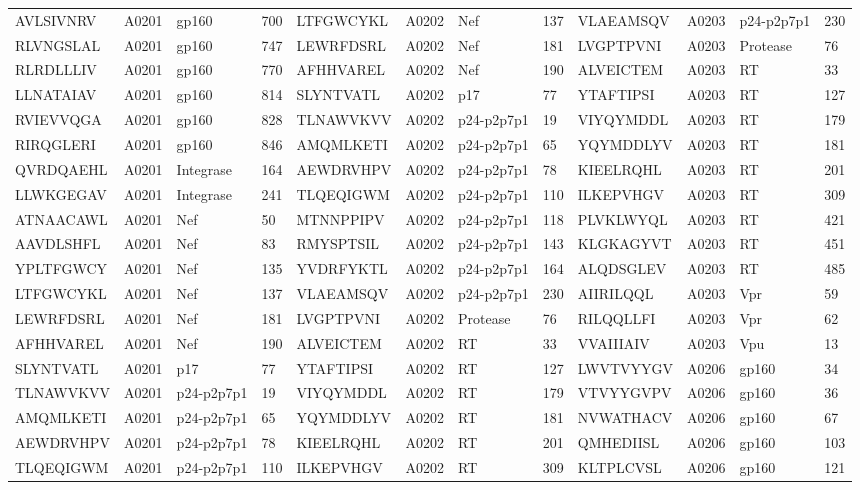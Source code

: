 \begin{table}[htp]
\begin{center}
\begin{sideways}
{\begin{tabulary}{1.5\textwidth}{|l|l|l|l|l|l|l|l|l|l|l|l|}
AVLSIVNRV & A0201 & gp160 & 700 & LTFGWCYKL & A0202 & Nef & 137 & VLAEAMSQV & A0203 & p24-p2p7p1 & 230 \\
RLVNGSLAL & A0201 & gp160 & 747 & LEWRFDSRL & A0202 & Nef & 181 & LVGPTPVNI & A0203 & Protease & 76 \\
RLRDLLLIV & A0201 & gp160 & 770 & AFHHVAREL & A0202 & Nef & 190 & ALVEICTEM & A0203 & RT & 33 \\
LLNATAIAV & A0201 & gp160 & 814 & SLYNTVATL & A0202 & p17 & 77 & YTAFTIPSI & A0203 & RT & 127 \\
RVIEVVQGA & A0201 & gp160 & 828 & TLNAWVKVV & A0202 & p24-p2p7p1 & 19 & VIYQYMDDL & A0203 & RT & 179 \\
RIRQGLERI & A0201 & gp160 & 846 & AMQMLKETI & A0202 & p24-p2p7p1 & 65 & YQYMDDLYV & A0203 & RT & 181 \\
QVRDQAEHL & A0201 & Integrase & 164 & AEWDRVHPV & A0202 & p24-p2p7p1 & 78 & KIEELRQHL & A0203 & RT & 201 \\
LLWKGEGAV & A0201 & Integrase & 241 & TLQEQIGWM & A0202 & p24-p2p7p1 & 110 & ILKEPVHGV & A0203 & RT & 309 \\
ATNAACAWL & A0201 & Nef & 50 & MTNNPPIPV & A0202 & p24-p2p7p1 & 118 & PLVKLWYQL & A0203 & RT & 421 \\
AAVDLSHFL & A0201 & Nef & 83 & RMYSPTSIL & A0202 & p24-p2p7p1 & 143 & KLGKAGYVT & A0203 & RT & 451 \\
YPLTFGWCY & A0201 & Nef & 135 & YVDRFYKTL & A0202 & p24-p2p7p1 & 164 & ALQDSGLEV & A0203 & RT & 485 \\
LTFGWCYKL & A0201 & Nef & 137 & VLAEAMSQV & A0202 & p24-p2p7p1 & 230 & AIIRILQQL & A0203 & Vpr & 59 \\
LEWRFDSRL & A0201 & Nef & 181 & LVGPTPVNI & A0202 & Protease & 76 & RILQQLLFI & A0203 & Vpr & 62 \\
AFHHVAREL & A0201 & Nef & 190 & ALVEICTEM & A0202 & RT & 33 & VVAIIIAIV & A0203 & Vpu & 13 \\
SLYNTVATL & A0201 & p17 & 77 & YTAFTIPSI & A0202 & RT & 127 & LWVTVYYGV & A0206 & gp160 & 34 \\
TLNAWVKVV & A0201 & p24-p2p7p1 & 19 & VIYQYMDDL & A0202 & RT & 179 & VTVYYGVPV & A0206 & gp160 & 36 \\
AMQMLKETI & A0201 & p24-p2p7p1 & 65 & YQYMDDLYV & A0202 & RT & 181 & NVWATHACV & A0206 & gp160 & 67 \\
AEWDRVHPV & A0201 & p24-p2p7p1 & 78 & KIEELRQHL & A0202 & RT & 201 & QMHEDIISL & A0206 & gp160 & 103 \\
TLQEQIGWM & A0201 & p24-p2p7p1 & 110 & ILKEPVHGV & A0202 & RT & 309 & KLTPLCVSL & A0206 & gp160 & 121 \\

\end{tabulary}}
\end{sideways}
\end{center}
\end{table}

